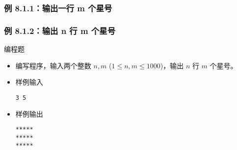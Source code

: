 \begin{frame}[fragile]
    \frametitle{例 8.1.1：输出一行 m 个星号}

\end{frame}

\begin{frame}[fragile]
    \frametitle{例 8.1.2：输出 n 行 m 个星号}


    \begin{exampleblock}{编程题}

        \begin{itemize}
            \item 编写程序，输入两个整数 $n,m$ ($1 \le n,m \le 1000$)，输出 $n$ 行 $m$ 个星号。

            \item 样例输入

                \lstinline|3 5|

            \item 样例输出

                \lstinline|*****|\\
                \lstinline|*****|\\
                \lstinline|*****|

        \end{itemize}

    \end{exampleblock}

\end{frame}

